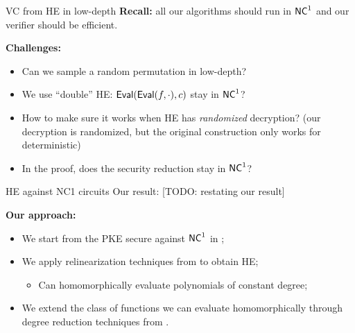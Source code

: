\begin{frame}{VC from HE in low-depth}
	\textbf{Recall:} all our algorithms should run in ${\mathsf{NC}}^1$ and our verifier should be efficient.
	
	\textbf{Challenges: }
	\begin{itemize}
		\item Can we sample a random permutation in low-depth?
		\item We use ``double'' HE: $\mathsf{Eval}(\mathsf{Eval}(f, \cdot), c)$ stay in ${\mathsf{NC}}^1$?
		\item How to make sure it works when HE has \textit{randomized} decryption? (our decryption is randomized, but the original construction only works for deterministic)
		\item In the proof, does the security reduction stay in ${\mathsf{NC}}^1$?
	\end{itemize}
\end{frame}

\begin{frame}{HE against NC1 circuits}
	Our result: [TODO: restating our result]
	
	\textbf{Our approach:}
	\begin{itemize}
		\item We start from the PKE secure against ${\mathsf{NC}}^1$ in \cite{fgcrypto};
		\item We apply relinearization techniques from \cite{fhe-lwe} to obtain HE;
		\begin{itemize}
			\item Can homomorphically evaluate polynomials of constant degree; 
		\end{itemize}
		\item We extend the class of functions we can evaluate homomorphically through degree reduction techniques from \cite{razborov1987lower}.
	\end{itemize}
\end{frame}

